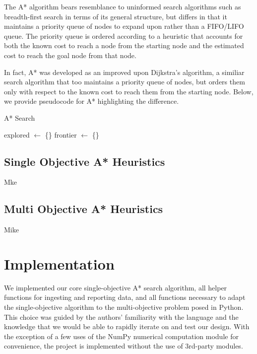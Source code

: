 \documentclass[12pt, conference, compsocconf]{IEEEtran}
\newcommand*\Let[2]{\State #1 $\gets$ #2}
\begin{document}
The A* algorithm bears resemblance to uninformed search algorithms such as breadth-first search in terms of its general structure, but differs in that it maintains a priority queue of nodes to expand upon rather than a FIFO/LIFO queue. 
The priority queue is ordered according to a heuristic that accounts for both the known cost to reach a node from the starting node and the estimated cost to reach the goal node from that node. 

In fact, A* was developed as an improved upon Dijkstra's algorithm, a similiar search algorithm that too maintains a priority queue of nodes, but orders them only with respect to the known cost to reach them from the starting node. 
Below, we provide pseudocode for A* highlighting the difference.

\begin{algorithm}
    \caption{A* Search}
    \label{alg-astar}
    \begin{algorithmic}[1]
        \Statex
            \Let{explored}{\{\}}
            \Let{frontier}{\{\}}
            \While{}
            
            \EndWhile
        \State {}
        \EndFunction
    \end{algorithmic}
\end{algorithm}
            
            

\subsection{Single Objective A* Heuristics}
Mke

\subsection{Multi Objective A* Heuristics}
Mike

\section{Implementation}
We implemented our core single-objective A* search algorithm, all helper functions for ingesting and reporting data, and all functions necessary to adapt the single-objective algorithm to the multi-objective problem posed in Python. 
This choice was guided by the authors' familiarity with the language and the knowledge that we would be able to rapidly iterate on and test our design.
With the exception of a few uses of the NumPy numerical computation module for convenience, the project is implemented without the use of 3rd-party modules. 
\end{document}
